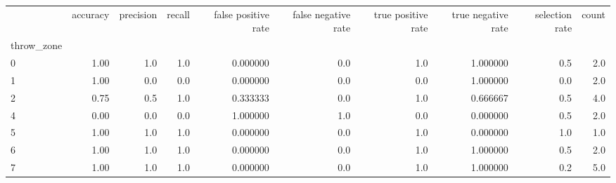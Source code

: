 \begin{tabular}{lrrrrrrrrr}
\toprule
{} &  accuracy &  precision &  recall &  false positive rate &  false negative rate &  true positive rate &  true negative rate &  selection rate &  count \\
throw\_zone &           &            &         &                      &                      &                     &                     &                 &        \\
\midrule
0          &      1.00 &        1.0 &     1.0 &             0.000000 &                  0.0 &                 1.0 &            1.000000 &             0.5 &    2.0 \\
1          &      1.00 &        0.0 &     0.0 &             0.000000 &                  0.0 &                 0.0 &            1.000000 &             0.0 &    2.0 \\
2          &      0.75 &        0.5 &     1.0 &             0.333333 &                  0.0 &                 1.0 &            0.666667 &             0.5 &    4.0 \\
4          &      0.00 &        0.0 &     0.0 &             1.000000 &                  1.0 &                 0.0 &            0.000000 &             0.5 &    2.0 \\
5          &      1.00 &        1.0 &     1.0 &             0.000000 &                  0.0 &                 1.0 &            0.000000 &             1.0 &    1.0 \\
6          &      1.00 &        1.0 &     1.0 &             0.000000 &                  0.0 &                 1.0 &            1.000000 &             0.5 &    2.0 \\
7          &      1.00 &        1.0 &     1.0 &             0.000000 &                  0.0 &                 1.0 &            1.000000 &             0.2 &    5.0 \\
\bottomrule
\end{tabular}
